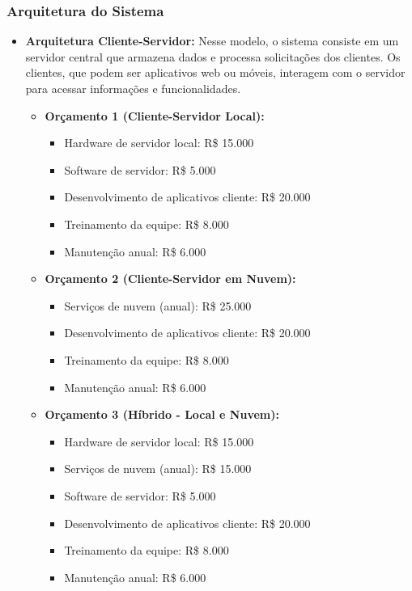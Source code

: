 	      \subsubsection{Arquitetura do Sistema}
	\begin{itemize}
		\item \textbf{Arquitetura Cliente-Servidor:} Nesse modelo, o sistema consiste em um servidor central que armazena dados e processa solicitações dos clientes. Os clientes, que podem ser aplicativos web ou móveis, interagem com o servidor para acessar informações e funcionalidades.
		
		\begin{itemize}
			\item \textbf{Orçamento 1 (Cliente-Servidor Local):}
			\begin{itemize}
				\item Hardware de servidor local: R\$ 15.000
				\item Software de servidor: R\$ 5.000
				\item Desenvolvimento de aplicativos cliente: R\$ 20.000
				\item Treinamento da equipe: R\$ 8.000
				\item Manutenção anual: R\$ 6.000
			\end{itemize}
			\item \textbf{Orçamento 2 (Cliente-Servidor em Nuvem):}
			\begin{itemize}
				\item Serviços de nuvem (anual): R\$ 25.000
				\item Desenvolvimento de aplicativos cliente: R\$ 20.000
				\item Treinamento da equipe: R\$ 8.000
				\item Manutenção anual: R\$ 6.000
			\end{itemize}
			\item \textbf{Orçamento 3 (Híbrido - Local e Nuvem):}
			\begin{itemize}
				\item Hardware de servidor local: R\$ 15.000
				\item Serviços de nuvem (anual): R\$ 15.000
				\item Software de servidor: R\$ 5.000
				\item Desenvolvimento de aplicativos cliente: R\$ 20.000
				\item Treinamento da equipe: R\$ 8.000
				\item Manutenção anual: R\$ 6.000
			\end{itemize}
		\end{itemize}
		

\end{itemize}
